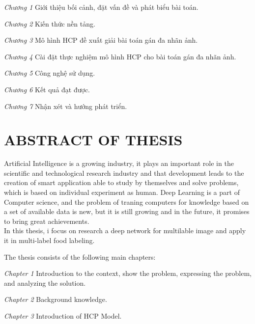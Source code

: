\documentclass[13pt, a4paper]{extreport}
\begin{document}
\vspace{2mm}
\indent \textit{Chương 1} Giới thiệu bối cảnh, đặt vấn đề và phát biểu bài toán.

\vspace{2mm}
\indent \textit{Chương 2} Kiến thức nền tảng.

\vspace{2mm}
\indent \textit{Chương 3} Mô hình HCP đề xuất giải bài toán gán đa nhãn ảnh.

\vspace{2mm}
\indent \textit{Chương 4} Cài đặt thực nghiệm mô hình HCP cho bài toán gán đa nhãn ảnh.

\vspace{2mm}
\indent \textit{Chương 5} Công nghệ sử dụng.

\vspace{2mm}
\indent \textit{Chương 6} Kết quả đạt được.

\vspace{2mm}
\indent \textit{Chương 7} Nhận xét và hướng phát triển.

\chapter*{ABSTRACT OF THESIS}
\indent Artificial Intelligence is a growing industry, it plays an important role in the scientific and technological research industry and that development leads to the creation of smart application able to study by themselves and solve problems, which is based on individual experiment as human. Deep Learning is a part of Computer science, and the problem of traning computers for knowledge based on a set of available data is new, but it is still growing and in the future, it promises to bring great achievements.\\
\indent In this thesis, i focus on research a deep network for multilable image and apply it in multi-label food labeling.

\vspace{2mm}
\indent The thesis consists of the following main chapters:

\vspace{2mm}
\indent \textit{Chapter 1} Introduction to the context, show the problem, expressing the problem, and analyzing the solution.

\vspace{2mm}
\indent \textit{Chapter 2} Background knowledge.

\vspace{2mm}
\indent \textit{Chapter 3} Introduction of HCP Model.
\end{document}
